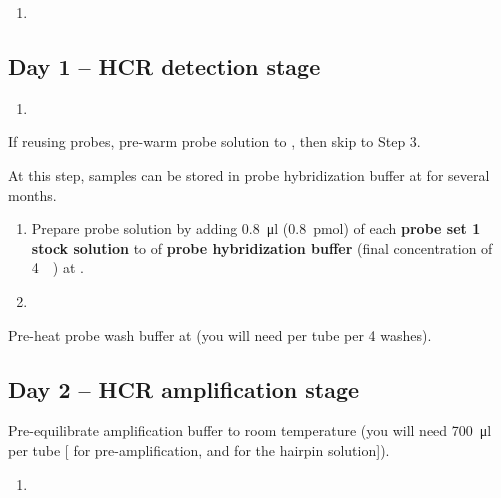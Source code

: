 \documentclass[12pt]{report}
\begin{document}
\begin{enumerate}[resume = steps]
  \item {}
\end{enumerate}

\subsection*{Day 1 -- HCR detection stage}
\begin{enumerate}[series = steps]
  \item {}
\end{enumerate}

\bigskip\alert{If reusing probes, pre-warm probe solution to \thirtysevendegree, then skip to Step 3.}

\alert{At this step, samples can be stored in probe hybridization buffer at \minustwenty{} for several months.}

\begin{enumerate}[resume = steps]
  \item Prepare probe solution by adding \qty{0.8}{\ul} (\qty{0.8}{\pmol}) of each \textbf{probe set \qty{1}{\micro\molar} stock solution} to \twohunmicrol{} of \textbf{probe hybridization buffer} (final concentration of \qty{4}{\nano\molar}) at \thirtysevendegree.\\
  \item {}
\end{enumerate}

\alert{Pre-heat probe wash buffer at \thirtysevendegree{} (you will need \fivehunmicrol per tube per 4 washes).}


\subsection*{Day 2 -- HCR amplification stage}

\alert{Pre-equilibrate amplification buffer to room temperature (you will need \qty{700}{\ul} per tube [\fivehunmicrol{} for pre-amplification, and \twohunmicrol{} for the hairpin solution]).}
\begin{enumerate}[series = steps]
  \item {}
\end{enumerate}
\end{document}

